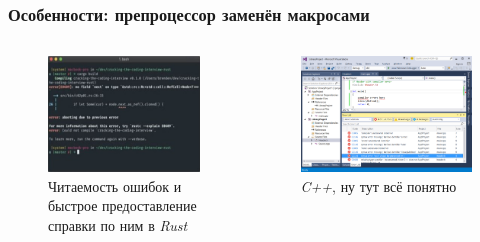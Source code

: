 \documentclass[11pt]{beamer}
\begin{document}
\begin{frame}
\frametitle{Особенности: препроцессор заменён макросами}
\begin{columns} %
\begin{figure}
    \centering
    \includegraphics[width=1.2\linewidth]{image10.png}
    \caption{Читаемость ошибок и быстрое предоставление справки по ним в \textit{Rust}}
\end{figure}
\centering
{}
\begin{figure}
    \centering
    \includegraphics[width=1.2\linewidth,height=1.1\linewidth]{image11.png}
    \caption{\textit{C++}, ну тут всё понятно}
\end{figure}
\centering
\end{columns}
\end{frame}
\end{document}
